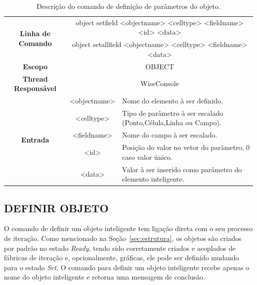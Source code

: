 \begin{center}
	\begin{table}[!htbp]
		\begin{tabularx}{\textwidth}{c|c|X}
			\toprule
			\multirow{2}{*}{\textbf{Linha de Comando}} & \multicolumn{2}{c}{object set\underline{\space\space}field <object\underline{\space\space}name> <cell\underline{\space\space}type> <field\underline{\space\space}name> <id> <data>} \\
			& \multicolumn{2}{c}{object set\underline{\space\space}all\underline{\space\space}field <object\underline{\space\space}name> <cell\underline{\space\space}type> <field\underline{\space\space}name> <data>} \\
			\midrule
			\textbf{Escopo} & \multicolumn{2}{c}{OBJECT} \\
			\hline
			\textbf{Thread Responsável} & \multicolumn{2}{c}{WiseConsole} \\
			\hline
			\multirow{5}{*}{\textbf{Entrada}} & <object\underline{\space\space}name> & Nome do elemento à ser definido. \\
			& <cell\underline{\space\space}type> & Tipo de parâmetro à ser escalado (Ponto,Célula,Linha ou Campo). \\
			& <field\underline{\space\space}name> & Nome do campo à ser escalado. \\
			& <id> & Posição do valor no vetor do parâmetro, 0 caso valor único. \\
			& <data> & Valor à ser inserido como parâmetro do elemento inteligente. \\
			\bottomrule
		\end{tabularx}
		\caption{Descrição do comando de definição de parâmetros do objeto.}
		\label{tab:set_field_object}
	\end{table}
\end{center}

\subsection{DEFINIR OBJETO}\label{sec:set_object}

O comando de definir um objeto inteligente tem ligação direta com o seu processo de iteração. Como mencionado na Seção~\ref{sec:estrutura}, os objetos são criados por padrão no estado \textit{Ready}, tendo sido corretamente criados e acoplados de fábricas de iteração e, opcionalmente, gráficas, ele pode ser definido mudando para o estado \textit{Set}. O comando para definir um objeto inteligente recebe apenas o nome do objeto inteligente e retorna uma mensagem de conclusão.

